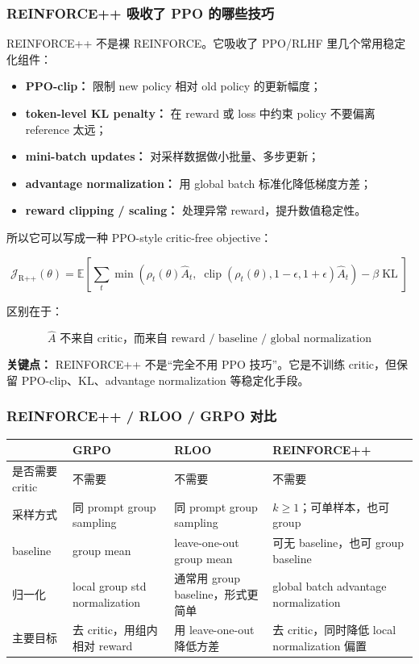 \subsubsection{REINFORCE++ 吸收了 PPO 的哪些技巧}

REINFORCE++ 不是裸 REINFORCE。它吸收了 PPO/RLHF 里几个常用稳定化组件：

\begin{itemize}[leftmargin=1.5em]
  \item \textbf{PPO-clip：} 限制 new policy 相对 old policy 的更新幅度；
  \item \textbf{token-level KL penalty：} 在 reward 或 loss 中约束 policy 不要偏离 reference 太远；
  \item \textbf{mini-batch updates：} 对采样数据做小批量、多步更新；
  \item \textbf{advantage normalization：} 用 global batch 标准化降低梯度方差；
  \item \textbf{reward clipping / scaling：} 处理异常 reward，提升数值稳定性。
\end{itemize}

所以它可以写成一种 PPO-style critic-free objective：

\[
\mathcal{J}_\text{R++}(\theta)
=
\mathbb{E}
\left[
\sum_t
\min
\left(
\rho_t(\theta)\hat{A}_t,\;
\operatorname{clip}(\rho_t(\theta),1-\epsilon,1+\epsilon)\hat{A}_t
\right)
-
\beta \operatorname{KL}
\right]
\]

区别在于：

\[
\hat{A}
\text{ 不来自 critic，而来自 reward / baseline / global normalization}
\]

\begin{warnbox}
\textbf{关键点：} REINFORCE++ 不是“完全不用 PPO 技巧”。它是不训练 critic，但保留 PPO-clip、KL、advantage normalization 等稳定化手段。
\end{warnbox}

\subsubsection{REINFORCE++ / RLOO / GRPO 对比}

\begin{center}
{\small
\begin{tabular}{p{2.7cm}p{3.3cm}p{3.4cm}p{3.4cm}}
\hline
 & \textbf{GRPO} & \textbf{RLOO} & \textbf{REINFORCE++} \\
\hline
是否需要 critic
&
不需要
&
不需要
&
不需要
\\
采样方式
&
同 prompt group sampling
&
同 prompt group sampling
&
$k\ge 1$；可单样本，也可 group
\\
baseline
&
group mean
&
leave-one-out group mean
&
可无 baseline，也可 group baseline
\\
归一化
&
local group std normalization
&
通常用 group baseline，形式更简单
&
global batch advantage normalization
\\
主要目标
&
去 critic，用组内相对 reward
&
用 leave-one-out 降低方差
&
去 critic，同时降低 local normalization 偏置
\\
\hline
\end{tabular}
}
\end{center}

